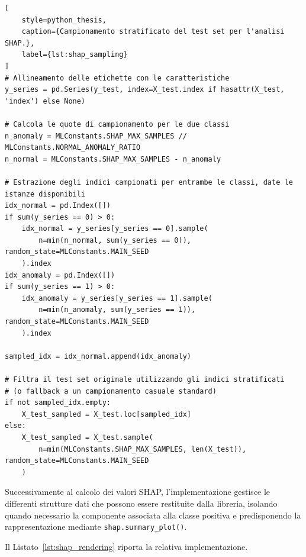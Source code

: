 \begin{lstlisting}[
    style=python_thesis,
    caption={Campionamento stratificato del test set per l'analisi SHAP.},
    label={lst:shap_sampling}
]
# Allineamento delle etichette con le caratteristiche
y_series = pd.Series(y_test, index=X_test.index if hasattr(X_test, 'index') else None)

# Calcola le quote di campionamento per le due classi
n_anomaly = MLConstants.SHAP_MAX_SAMPLES // MLConstants.NORMAL_ANOMALY_RATIO
n_normal = MLConstants.SHAP_MAX_SAMPLES - n_anomaly

# Estrazione degli indici campionati per entrambe le classi, date le istanze disponibili
idx_normal = pd.Index([])
if sum(y_series == 0) > 0:
    idx_normal = y_series[y_series == 0].sample(
        n=min(n_normal, sum(y_series == 0)), random_state=MLConstants.MAIN_SEED
    ).index
idx_anomaly = pd.Index([])
if sum(y_series == 1) > 0:
    idx_anomaly = y_series[y_series == 1].sample(
        n=min(n_anomaly, sum(y_series == 1)), random_state=MLConstants.MAIN_SEED
    ).index

sampled_idx = idx_normal.append(idx_anomaly)

# Filtra il test set originale utilizzando gli indici stratificati
# (o fallback a un campionamento casuale standard)
if not sampled_idx.empty:
    X_test_sampled = X_test.loc[sampled_idx]
else:
    X_test_sampled = X_test.sample(
        n=min(MLConstants.SHAP_MAX_SAMPLES, len(X_test)), random_state=MLConstants.MAIN_SEED
    )
\end{lstlisting}

Successivamente al calcolo dei valori SHAP, l'implementazione gestisce le differenti strutture dati che possono essere restituite dalla libreria, isolando quando necessario la componente associata alla classe positiva e predisponendo la rappresentazione mediante \texttt{shap.summary\_plot()}.

Il Listato~\ref{lst:shap_rendering} riporta la relativa implementazione.


